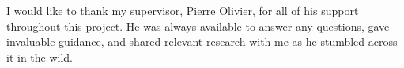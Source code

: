 I would like to thank my supervisor, Pierre Olivier, for all of his support
throughout this project. He was always available to answer any questions, gave
invaluable guidance, and shared relevant research with me as he stumbled across
it in the wild. 

\clearpage

\tableofcontents

\clearpage

\printacronyms[name=Acronyms and Abbreviations]

\clearpage

\listoffigures

\clearpage

\listoftables

\clearpage

\listoflistings
